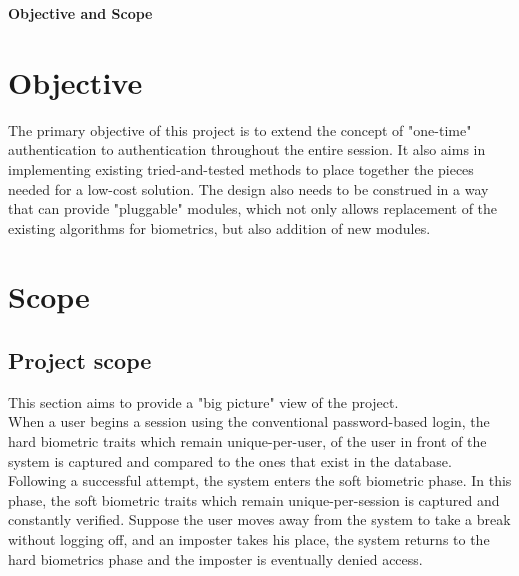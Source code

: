 \documentclass[12pt]{article}			%
\begin{document}

\begin{center}
	{\LARGE \bf Objective and Scope}
\end{center}

\section{Objective}
The primary objective of this project is to extend the concept of "one-time" authentication to authentication throughout the entire session.
It also aims in implementing existing tried-and-tested methods to place together the pieces needed for a low-cost solution.
The design also needs to be construed in a way that can provide "pluggable" modules, which not only allows replacement of the existing algorithms for biometrics, but also addition of new modules.

\section{Scope}
\subsection{Project scope}
This section aims to provide a "big picture" view of the project. \\
When a user begins a session using the conventional password-based login, the hard biometric traits which remain unique-per-user, of the user in front of the system is captured and compared to the ones that exist in the database.
Following a successful attempt, the system enters the soft biometric phase.
In this phase, the soft biometric traits which remain unique-per-session is captured and constantly verified.
Suppose the user moves away from the system to take a break without logging off, and an imposter takes his place, the system returns to the hard biometrics phase and the imposter is eventually denied access.
\end{document}
